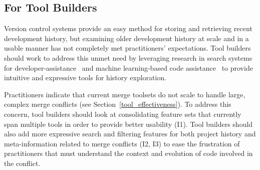 \subsection{For Tool Builders}
Version control systems provide an easy method for storing and retrieving recent development history, but examining older development history at scale and in a usable manner has not completely met practitioners' expectations.
Tool builders should work to address this unmet need by leveraging research in search systems for developer-assistance~\cite{nabi2016putting} and machine learning-based code assistance~\cite{bradley2011history_exploration} to provide intuitive and expressive tools for history exploration.

Practitioners indicate that current merge toolsets do not scale to handle large, complex merge conflicts (see Section~\ref{tool_effectiveness}).
To address this concern, tool builders should look at consolidating feature sets that currently span multiple tools in order to provide better usability (I1).
Tool builders should also add more expressive search and filtering features for both project history and meta-information related to merge conflicts (I2, I3) to ease the frustration of practitioners that must understand the context and evolution of code involved in the conflict.